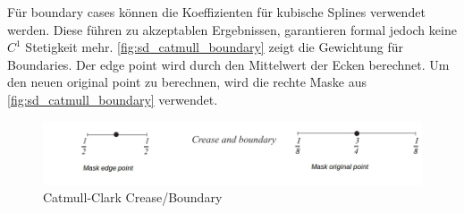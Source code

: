 Für boundary cases können die Koeffizienten für kubische Splines verwendet werden.
Diese führen zu akzeptablen Ergebnissen, garantieren formal jedoch keine \(C^1\) Stetigkeit mehr. \cite[S. 75f]{Zorin.subdivcourse}
\autoref{fig:sd_catmull_boundary} zeigt die Gewichtung für Boundaries.
Der edge point wird durch den Mittelwert der Ecken berechnet.
Um den neuen original point zu berechnen, wird die rechte Maske aus \autoref{fig:sd_catmull_boundary}
verwendet.

\begin{figure}
\centering
\includegraphics[width=1.0\textwidth]{content/media/sd_catmull_boundary.jpg}
\caption{Catmull-Clark Crease/Boundary \cite[S. 76]{Zorin.subdivcourse}}
\label{fig:sd_catmull_boundary}
\end{figure}




